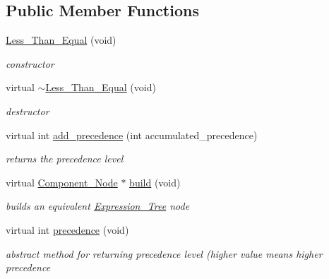 \subsection*{Public Member Functions}
\begin{DoxyCompactItemize}
\item 
\hyperlink{classMadara_1_1Expression__Tree_1_1Less__Than__Equal_ab5bc5f1db635a40fe9267ea37599a6f9}{Less\_\-Than\_\-Equal} (void)
\begin{DoxyCompactList}\small\item\em constructor \item\end{DoxyCompactList}\item 
virtual \hyperlink{classMadara_1_1Expression__Tree_1_1Less__Than__Equal_a34776fa6b01ab31aaaf01895c72d64b1}{$\sim$Less\_\-Than\_\-Equal} (void)
\begin{DoxyCompactList}\small\item\em destructor \item\end{DoxyCompactList}\item 
virtual int \hyperlink{classMadara_1_1Expression__Tree_1_1Less__Than__Equal_ab302dde509dddc5ddbd16fcb387ad5aa}{add\_\-precedence} (int accumulated\_\-precedence)
\begin{DoxyCompactList}\small\item\em returns the precedence level \item\end{DoxyCompactList}\item 
virtual \hyperlink{classMadara_1_1Expression__Tree_1_1Component__Node}{Component\_\-Node} $\ast$ \hyperlink{classMadara_1_1Expression__Tree_1_1Less__Than__Equal_a3ea6af492fb5ad3734564deeb81ef636}{build} (void)
\begin{DoxyCompactList}\small\item\em builds an equivalent \hyperlink{classMadara_1_1Expression__Tree_1_1Expression__Tree}{Expression\_\-Tree} node \item\end{DoxyCompactList}\item 
virtual int \hyperlink{classMadara_1_1Expression__Tree_1_1Symbol_ac060dedb8d16864591b259df375109b3}{precedence} (void)
\begin{DoxyCompactList}\small\item\em abstract method for returning precedence level (higher value means higher precedence \item\end{DoxyCompactList}\end{DoxyCompactItemize}
